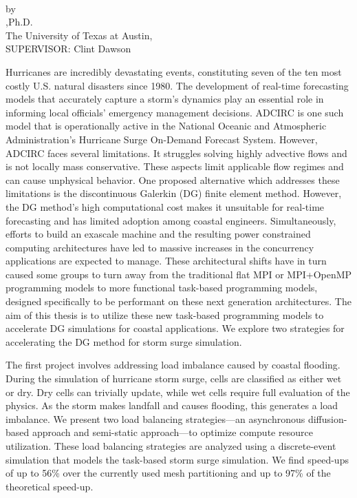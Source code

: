\newpage
\thispagestyle{plain} 
\makeatletter
\begin{center}
\textbf{\large
\@title
}\\
\vspace{1cm}
by\\
\vspace{1cm}
\@author,\space Ph.D. \\
The University of Texas at Austin, \theyear \\
SUPERVISOR: Clint Dawson
\end{center}
\vspace{1cm}

\indent
    Hurricanes are incredibly devastating events, constituting seven of the ten most costly U.S. natural disasters since 1980. The development of real-time forecasting models that accurately capture a storm's dynamics play an essential role in informing local officials' emergency management decisions. 
    ADCIRC is one such model that is operationally active in the National Oceanic and Atmospheric Administration's Hurricane Surge On-Demand Forecast System. 
    However, ADCIRC faces several limitations. It struggles solving highly advective flows and is not locally mass conservative. These aspects limit applicable flow regimes and can cause unphysical behavior. One proposed alternative which addresses these limitations is the discontinuous Galerkin (DG) finite element method. However, the DG method's high computational cost makes it unsuitable for real-time forecasting and has limited adoption among coastal engineers. Simultaneously, efforts to build an exascale machine and the resulting power constrained computing architectures have led to massive increases in the concurrency applications are expected to manage. These architectural shifts have in turn caused some groups to turn away from the traditional flat MPI or MPI+OpenMP programming models to more functional task-based programming models, designed specifically to be performant on these next generation architectures. The aim of this thesis is to utilize these new task-based programming models to accelerate DG simulations for coastal applications. We explore two strategies for accelerating the DG method for storm surge simulation.

    The first project involves addressing load imbalance caused by coastal flooding. During the simulation of hurricane storm surge, cells are classified as either wet or dry. Dry cells can trivially update, while wet cells require full evaluation of the physics. As the storm makes landfall and causes flooding, this generates a load imbalance. We present two load balancing strategies---an asynchronous diffusion-based approach and semi-static approach---to optimize compute resource utilization. These load balancing strategies are analyzed using a discrete-event simulation that models the task-based storm surge simulation. We find speed-ups of up to 56\% over the currently used mesh partitioning and up to 97\% of the theoretical speed-up.

